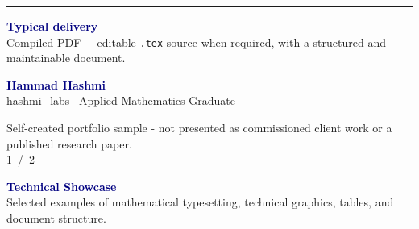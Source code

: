 \documentclass[10pt,a4paper]{article}
\newcommand{\smallrule}{\textcolor{Line}{\rule{\linewidth}{0.5pt}}}
\begin{document}
\smallrule

\vspace{0.35em}
\begin{minipage}[t]{0.62\linewidth}
{\footnotesize\bfseries\textcolor{Navy}{Typical delivery}}\\[-0.05em]
{\scriptsize\textcolor{Slate}{Compiled PDF + editable \texttt{.tex} source when required, with a structured and maintainable document.}}
\end{minipage}
\hfill
\begin{minipage}[t]{0.32\linewidth}
\raggedleft
{\footnotesize\bfseries\textcolor{Navy}{Hammad Hashmi}}\\[-0.05em]
{\scriptsize\textcolor{Slate}{hashmi\_labs \textemdash\ Applied Mathematics Graduate}}
\end{minipage}

\vfill
\begin{center}
{\scriptsize\textcolor{Slate}{Self-created portfolio sample - not presented as commissioned client work or a published research paper.}}\\[-0.05em]
{\scriptsize\textcolor{Slate}{1 \,/\, 2}}
\end{center}

\newpage

\vspace*{0.1cm}

{\fontsize{20}{23}\selectfont\bfseries\textcolor{Navy}{Technical Showcase}}
\\[-0.1em]
{\small\textcolor{Slate}{Selected examples of mathematical typesetting, technical graphics, tables, and document structure.}}

\vspace{0.45em}
\end{document}
